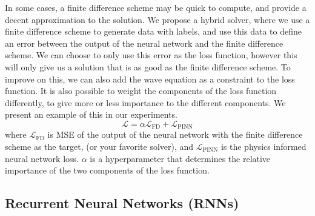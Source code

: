 \documentclass[twoside,11pt]{report}
\begin{document}
    In some cases, a finite difference
    scheme may be quick to compute, and provide a decent approximation to the solution. We propose a hybrid solver, where
    we use a finite difference scheme to generate data with labels, and use this data to define an error between the
    output of the neural network and the finite difference scheme. We can choose to only use this error
    as the loss function, however this will only give us a solution that is as good as the finite difference scheme.
    To improve on this, we can also add the wave equation as a constraint to the loss function.
    It is also possible to weight the components of the loss function differently, to give more or less 
    importance to the different components. We present an example of this in our experiments.
    \begin{equation}
    \mathcal{L} = \alpha\mathcal{L}_{\text{FD}} + \mathcal{L}_{\text{PINN}}
    \end{equation}
    where $\mathcal{L}_{\text{FD}}$ is MSE of the output of the neural network with the finite difference scheme as 
    the target,
    (or your favorite solver), 
    and $\mathcal{L}_{\text{PINN}}$ is the physics informed neural network loss. $\alpha$ is a hyperparameter
    that determines the relative importance of the two components of the loss function.
    \\
    \cite{krishnapriyan2021characterizing}

\subsection{Recurrent Neural Networks (RNNs)}
\label{sec:rnn}
\end{document}
